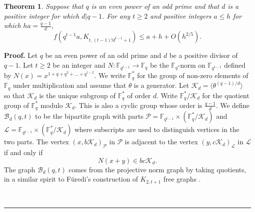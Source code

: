 \documentclass[12pt]{article}%
\newtheorem{theorem}{Theorem}[section]
\newenvironment{proof}[1][Proof]{\noindent\textbf{#1.} }
{\hfill \ \rule{0.5em}{0.5em}}
\begin{document}
\begin{theorem}\label{general kst}
Suppose that $q$ is an even power of an odd prime and 
that $d$ is a positive integer for which $d | q - 1$.  
For any $t \geq 2$ and positive integers $a\leq h$
for which $ha = \frac{q-1}{d}$, 
\begin{equation}\label{norm graph ub2}
	f( q^{t-1} a , K_{ t , ( t - 1)! d^{t-1} + 1} ) \leq a + h + O( h^{2/5} ).
	\end{equation}
 \end{theorem}
\begin{proof}
Let $q$ be an even power of an odd prime and
$d$ be a positive divisor of $q-1$. 
Let $t \geq 2$ be an integer and $N : \mathbb{F}_{q^{t-1}} \rightarrow \mathbb{F}_{q}$ 
be the $\mathbb{F}_{q}$-norm on $\mathbb{F}_{q^{ t - 1} }$ defined by 
$N(x) = x^{ 1  + q + q^2  + \dots  + q^{  t - 2 }}$.
We write $\mathbb{F}_q^*$ for the group of non-zero elements
of $\mathbb{F}_q$ under multiplication and assume that 
$\theta$ is a generator.  Let $\mathcal{K}_d = \langle \theta^{ (q-1)/d } \rangle$ so that $\mathcal{K}_d$ is the unique subgroup of $\mathbb{F}_q^*$ of order $d$.
Write 
$\mathbb{F}_q^* / \mathcal{K}_d$ for the quotient group
of $\mathbb{F}_q^*$ modulo $\mathcal{K}_d$.  This is also a cyclic group whose order is $\frac{q-1}{d}$.  
We define $\mathcal{B}_d (q,t)$ to be the bipartite graph with parts 
$\mathcal{P} = \mathbb{F}_{q^{t-1} } \times ( \mathbb{F}_q^* / \mathcal{K}_d )$ 
and $\mathcal{L} = \mathbb{F}_{q^{t-1} } \times ( \mathbb{F}_q^* / \mathcal{K}_d )$ where subscripts are used to distinguish vertices in the two parts.  
The vertex $(x , b \mathcal{K}_d)_{ \mathcal{P} } $ 
in $\mathcal{P}$
is adjacent to the vertex 
$(y , c \mathcal{K}_d)_{ \mathcal{L} }$ in $\mathcal{L}$ if and only if 
\[
N(x + y) \in bc \mathcal{K}_d.
\]
  The graph $\mathcal{B}_d (q,t)$ comes from the projective norm graph by taking quotients, in a similar spirit to F\"uredi's construction of $K_{2,t+1}$ free graphs \cite{Furedi}.


\end{proof}
\end{document}
